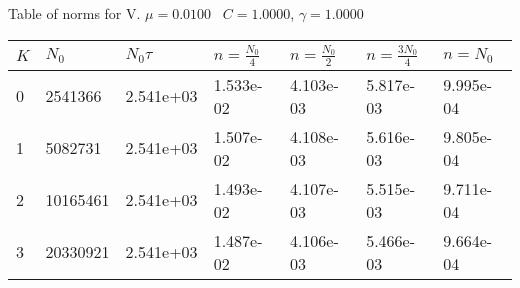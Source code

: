\begin{center}
Table of norms for V. $\mu = 0.0100$ \, $C = 1.0000$, $\gamma = 1.0000$
  
\begin{tabular}{|p{0.8in}|p{0.8in}|p{0.8in}|p{0.8in}|p{0.8in}|p{0.8in}|p{0.8in}|} \hline
$K$ &$N_0$ &$N_0 \tau$ &$n = \frac{N_0}{4}$ &$n = \frac{N_0}{2}$ &$n = \frac{3N_0}{4}$ &$n = N_0$ \\ \hline 
0 &2541366 &2.541e+03 &1.533e-02 &4.103e-03 &5.817e-03 &9.995e-04 \\ \hline 
1 &5082731 &2.541e+03 &1.507e-02 &4.108e-03 &5.616e-03 &9.805e-04 \\ \hline 
2 &10165461 &2.541e+03 &1.493e-02 &4.107e-03 &5.515e-03 &9.711e-04 \\ \hline 
3 &20330921 &2.541e+03 &1.487e-02 &4.106e-03 &5.466e-03 &9.664e-04 \\ \hline 

\end{tabular}\\[20pt]
\end{center}
